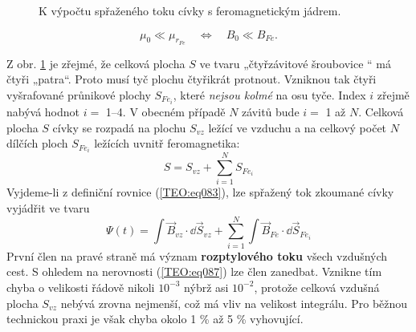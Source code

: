       \begin{figure}[ht!]
        \centering  
        \caption{K výpočtu spřaženého toku cívky s feromagnetickým jádrem. \cite[s.~17]{Patocka4}} 
        \label{teo:fig049}
      \end{figure}

      \begin{equation}\label{TEO:eq087}
        \mu_0\ll\mu_{r_{Fe}}\quad\Longleftrightarrow\quad B_0\ll B_{Fe}. 
      \end{equation}
      
      Z obr.  \ref{teo:fig049} je zřejmé, že celková plocha \(S\) ve tvaru „čtyřzávitové šroubovice
      “ má čtyři „patra“. Proto musí tyč plochu čtyřikrát protnout. Vzniknou tak čtyři vyšrafované
      průnikové plochy \(S_{Fe_i}\), které \emph{nejsou kolmé} na osu tyče. Index \(i\) zřejmě
      nabývá hodnot \(i =\) \numrange{1}{4}. V obecném případě \(N\) závitů bude \(i =\) \num{1} až
      \(N\). Celková plocha \(S\) cívky se rozpadá na plochu \(S_{vz}\) ležící ve vzduchu a na
      celkový počet \(N\) dílčích ploch \(S_{Fe_i}\) ležících uvnitř feromagnetika:
      \begin{equation}\label{TEO:eq088}
        S = S_{vz} + \sum\limits_{i=1}^{N}S_{Fe_i} 
      \end{equation}
      Vyjdeme-li z definiční rovnice (\ref{TEO:eq083}), lze spřažený tok zkoumané cívky 
      vyjádřit ve tvaru
      \begin{equation}\label{ES:eq_zakl_elm18}
         \Psi(t) = \int \vec{B}_{vz}\cdot \dd{\vec{S}}_{vz} + 
                   \sum_{i=1}^{N}\int\vec{B}_{Fe}\cdot \dd{\vec{S}}_{Fe_i}
      \end{equation}
      První člen na pravé straně má význam \textbf{rozptylového toku} všech vzdušných cest. S 
      ohledem na nerovnosti (\ref{TEO:eq087}) lze člen zanedbat. Vznikne tím chyba o 
      velikosti řádově nikoli \(10^{-3}\) nýbrž asi \(10^{-2}\), protože celková vzdušná plocha 
      \(S_{vz}\) nebývá zrovna nejmenší, což má vliv na velikost integrálu. Pro běžnou technickou 
      praxi je však chyba okolo 1 \% až 5 \% vyhovující.
      
